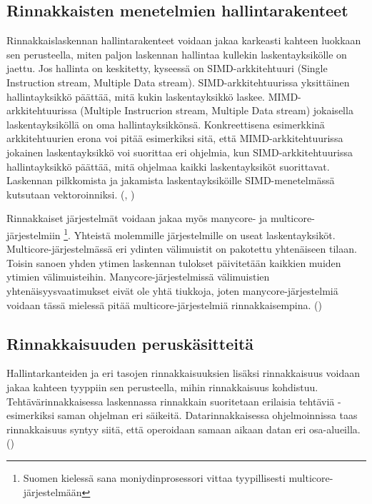 \subsection{Rinnakkaisten menetelmien hallintarakenteet}

Rinnakkaislaskennan hallintarakenteet voidaan jakaa karkeasti kahteen luokkaan sen perusteella,
miten paljon laskennan hallintaa kullekin laskentayksikölle on jaettu. Jos
hallinta on keskitetty, kyseessä on SIMD-arkkitehtuuri (Single Instruction
stream, Multiple Data stream). SIMD-arkkitehtuurissa yksittäinen
hallintayksikkö päättää, mitä kukin laskentayksikkö laskee.
MIMD-arkkitehtuurissa (Multiple Instrucrion stream, Multiple Data stream)
jokaisella laskentayksiköllä on oma hallintayksikkönsä. Konkreettisena
esimerkkinä arkkitehtuurien erona voi pitää esimerkiksi sitä, että
MIMD-arkkitehtuurissa jokainen laskentayksikkö voi suorittaa eri ohjelmia, kun
SIMD-arkkitehtuurissa hallintayksikkö päättää, mitä ohjelmaa kaikki
laskentayksiköt suorittavat. Laskennan pilkkomista ja jakamista
laskentayksiköille SIMD-menetelmässä kutsutaan vektoroinniksi. (\citealt{intro}, \citealt{rauber})

Rinnakkaiset järjestelmät voidaan jakaa myös manycore- ja
multicore-järjestelmiin \footnote{Suomen kielessä sana moniydinprosessori
vittaa tyypillisesti multicore-järjestelmään}. Yhteistä molemmille
järjestelmille on useat laskentayksiköt. Multicore-järjestelmässä eri
ydinten välimuistit on pakotettu yhtenäiseen tilaan. Toisin sanoen yhden
ytimen laskennan tulokset päivitetään kaikkien muiden ytimien välimuisteihin.
Manycore-järjestelmissä välimuistien yhtenäisyysvaatimukset eivät ole yhtä
tiukkoja, joten manycore-järjestelmiä voidaan tässä mielessä pitää
multicore-järjestelmiä rinnakkaisempina. (\citealt{vajda})


\subsection{Rinnakkaisuuden peruskäsitteitä}

Hallintarkanteiden ja eri tasojen rinnakkaisuuksien lisäksi rinnakkaisuus voidaan jakaa
kahteen tyyppiin sen perusteella, mihin rinnakkaisuus kohdistuu.
Tehtävärinnakkaisessa laskennassa rinnakkain suoritetaan erilaisia
tehtäviä - esimerkiksi saman ohjelman eri säikeitä. Datarinnakkaisessa
ohjelmoinnissa taas rinnakkaisuus syntyy siitä, että operoidaan samaan aikaan
datan eri osa-alueilla. (\citealt{intro})

